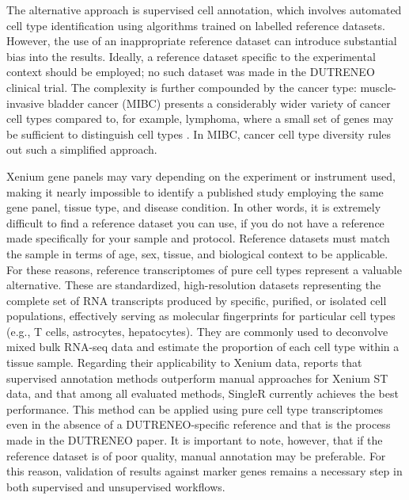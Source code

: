 The alternative approach is supervised cell annotation, which involves automated cell type identification using algorithms trained on labelled reference datasets. However, the use of an inappropriate reference dataset can introduce substantial bias into the results. Ideally, a reference dataset specific to the experimental context should be employed; no such dataset was made in the DUTRENEO clinical trial. The complexity is further compounded by the cancer type: muscle-invasive bladder cancer (MIBC) presents a considerably wider variety of cancer cell types compared to, for example, lymphoma, where a small set of genes may be sufficient to distinguish cell types . In MIBC, cancer cell type diversity rules out such a simplified approach.

Xenium gene panels may vary depending on the experiment or instrument used, making it nearly impossible to identify a published study employing the same gene panel, tissue type, and disease condition.  In other words, it is extremely difficult to find a reference dataset you can use, if you do not have a reference made specifically for your sample and protocol. Reference datasets must match the sample in terms of age, sex, tissue, and biological context to be applicable. For these reasons, reference transcriptomes of pure cell types represent a valuable alternative. These are standardized, high-resolution datasets representing the complete set of RNA transcripts produced by specific, purified, or isolated cell populations, effectively serving as molecular fingerprints for particular cell types (e.g., T cells, astrocytes, hepatocytes). They are commonly used to deconvolve mixed bulk RNA-seq data and estimate the proportion of each cell type within a tissue sample. Regarding their applicability to Xenium data, \cite{Jinming Cheng} reports that supervised annotation methods outperform manual approaches for Xenium ST data, and that among all evaluated methods, SingleR currently achieves the best performance. This method can be applied using pure cell type transcriptomes even in the absence of a DUTRENEO-specific reference and that is the process made in the DUTRENEO paper. It is important to note, however, that if the reference dataset is of poor quality, manual annotation may be preferable. For this reason, validation of results against marker genes remains a necessary step in both supervised and unsupervised workflows.


